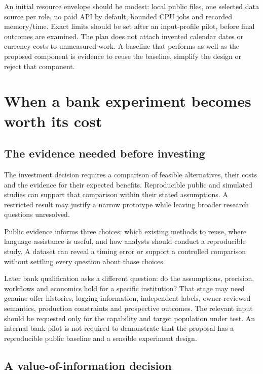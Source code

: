An initial resource envelope should be modest: local public files, one
selected data source per role, no paid API by default, bounded CPU jobs
and recorded memory/time. Exact limits should be set after an
input-profile pilot, before final outcomes are examined. The plan does
not attach invented calendar dates or currency costs to unmeasured work.
A baseline that performs as well as the proposed component is evidence
to reuse the baseline, simplify the design or reject that component.

\hypertarget{pd15:investment}{%
\chapter{When a bank experiment becomes worth its
cost}\label{pd15:investment}}

\hypertarget{proposal-acceptance-and-later-qualification}{%
\section{The evidence needed before investing}\label{proposal-acceptance-and-later-qualification}}

The investment decision requires a comparison of feasible alternatives,
their costs and the evidence for their expected benefits. Reproducible
public and simulated studies can support that comparison within their
stated assumptions. A restricted result may justify a narrow prototype
while leaving broader research questions unresolved.

Public evidence informs three choices: which existing methods to reuse,
where language assistance is useful, and how analysts should conduct a
reproducible study. A dataset can reveal a timing error or support a
controlled comparison without settling every question about those choices.

Later bank qualification asks a different question: do the assumptions,
precision, workflows and economics hold for a specific institution? That
stage may need genuine offer histories, logging information, independent
labels, owner-reviewed semantics, production constraints and prospective
outcomes. The relevant input should be requested only for the capability
and target population under test. An internal bank pilot is not required
to demonstrate that the proposal has a reproducible public baseline and
a sensible experiment design.

\hypertarget{a-value-of-information-decision}{%
\section{A value-of-information
decision}\label{a-value-of-information-decision}}


